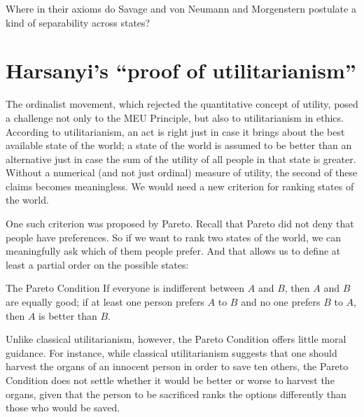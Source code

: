\begin{exercise2}
  Where in their axioms do Savage and von Neumann and Morgenstern
  postulate a kind of separability across states?
\end{exercise2}

\section{Harsanyi's ``proof of utilitarianism''}

The ordinalist movement, which rejected the quantitative concept of utility,
posed a challenge not only to the MEU Principle, but also to utilitarianism in
ethics. According to utilitarianism, an act is right just in case it brings
about the best available state of the world; a state of the world is assumed to
be better than an alternative just in case the sum of the utility of all people
in that state is greater. Without a numerical (and not just ordinal) measure of
utility, the second of these claims becomes meaningless. We would need a new
criterion for ranking states of the world.

One such criterion was proposed by Pareto. Recall that Pareto did not
deny that people have preferences. So if we want to rank two states of
the world, we can meaningfully ask which of them people prefer. And
that allows us to define at least a partial order on the possible
states:
%
\begin{genericthm}{The Pareto Condition}
  If everyone is indifferent between  $A$ and $B$, then $A$ and $B$
  are equally good; if at least one person prefers $A$ to $B$ and no
  one prefers $B$ to $A$, then $A$ is better than $B$.
\end{genericthm}
%

Unlike classical utilitarianism, however, the Pareto Condition offers
little moral guidance. For instance, while classical utilitarianism
suggests that one should harvest the organs of an innocent person in
order to save ten others, the Pareto Condition does not settle whether
it would be better or worse to harvest the organs, given that the
person to be sacrificed ranks the options differently than those who
would be saved.


